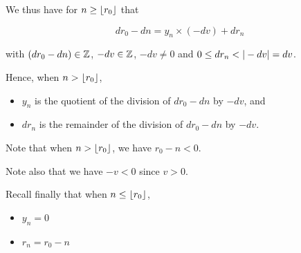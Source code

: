 \bigskip

We thus have for $n \geq \lfloor r_0 \rfloor$ that

$$d r_0 - d n = y_n \times (- d v) + d r_n$$

with $(d r_0 - d n) \in \mathbb{Z}$, $- d v \in \mathbb{Z}$, $- d v \neq 0$ and $0 \leq
d r_n < | - d v | = d v$.

\smallskip 

Hence, when $n > \lfloor r_0 \rfloor$,
\begin{itemize}
\item $y_n$ is the quotient of the division of $d r_0 - d n$ by $- d
  v$, and
\item $d r_n$ is the remainder of the division of $d r_0 - d n$ by $- d
  v$.
\end{itemize}

Note that when $n > \lfloor r_0 \rfloor$, we have $r_0 - n < 0$. 

Note also that we have $- v < 0$ since $v > 0$.

\smallskip

Recall finally that when $n \leq \lfloor r_0 \rfloor$,
\begin{itemize}
\item $y_n = 0$
\item $r_n = r_0 - n$
\end{itemize}


